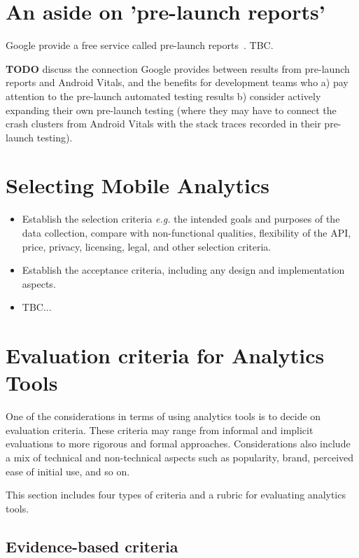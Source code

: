 \section{An aside on 'pre-launch reports'}
Google provide a free service called pre-launch reports~\cite{google_use_pre_launch_reports}. TBC.

\textbf{TODO} discuss the connection Google provides between results from pre-launch reports and Android Vitals, and the benefits for development teams who a) pay attention to the pre-launch automated testing results b) consider actively expanding their own pre-launch testing (where they may have to connect the crash clusters from Android Vitals with the stack traces recorded in their pre-launch testing).

\section{Selecting Mobile Analytics}

\begin{itemize}
    \item Establish the selection criteria \emph{e.g.} the intended goals and purposes of the data collection, compare with non-functional qualities, flexibility of the API, price, privacy, licensing, legal, and other selection criteria.
    \item Establish the acceptance criteria, including any design and implementation aspects.
    \item TBC...
\end{itemize}

\section{Evaluation criteria for Analytics Tools}
One of the considerations in terms of using analytics tools is to decide on evaluation criteria. These criteria may range from informal and implicit evaluations to more rigorous and formal approaches. Considerations also include a mix of technical and non-technical aspects such as popularity, brand, perceived ease of initial use, and so on.

This section includes four types of criteria and a rubric for evaluating analytics tools.

\subsection{Evidence-based criteria}

